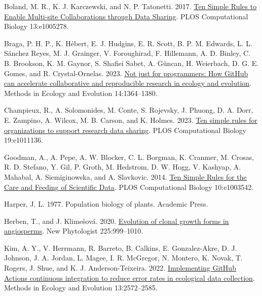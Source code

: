 \documentclass[
  letterpaper,
  oneside,
  open=any]{scrbook}
\newlength{\cslhangindent}
\newenvironment{CSLReferences}[2] %
 {\begin{list}{}{%
  \setlength{\itemindent}{0pt}
  \setlength{\leftmargin}{0pt}
  \setlength{\parsep}{0pt}
  \ifodd #1
   \setlength{\leftmargin}{\cslhangindent}
   \setlength{\itemindent}{-1\cslhangindent}
  \fi
  \setlength{\itemsep}{#2\baselineskip}}}
 {\end{list}}
\begin{document}
\label{refs}
\begin{CSLReferences}{1}{0}
Boland, M. R., K. J. Karczewski, and N. P. Tatonetti. 2017.
\href{https://doi.org/10.1371/journal.pcbi.1005278}{Ten {Simple Rules}
to {Enable Multi-site Collaborations} through {Data Sharing}}. PLOS
Computational Biology 13:e1005278.

Braga, P. H. P., K. Hébert, E. J. Hudgins, E. R. Scott, B. P. M.
Edwards, L. L. Sánchez Reyes, M. J. Grainger, V. Foroughirad, F.
Hillemann, A. D. Binley, C. B. Brookson, K. M. Gaynor, S. Shafiei Sabet,
A. Güncan, H. Weierbach, D. G. E. Gomes, and R. Crystal-Ornelas. 2023.
\href{https://doi.org/10.1111/2041-210X.14108}{Not just for programmers:
{How GitHub} can accelerate collaborative and reproducible research in
ecology and evolution}. Methods in Ecology and Evolution 14:1364--1380.

Champieux, R., A. Solomonides, M. Conte, S. Rojevsky, J. Phuong, D. A.
Dorr, E. Zampino, A. Wilcox, M. B. Carson, and K. Holmes. 2023.
\href{https://doi.org/10.1371/journal.pcbi.1011136}{Ten simple rules for
organizations to support research data sharing}. PLOS Computational
Biology 19:e1011136.

Goodman, A., A. Pepe, A. W. Blocker, C. L. Borgman, K. Cranmer, M.
Crosas, R. D. Stefano, Y. Gil, P. Groth, M. Hedstrom, D. W. Hogg, V.
Kashyap, A. Mahabal, A. Siemiginowska, and A. Slavkovic. 2014.
\href{https://doi.org/10.1371/journal.pcbi.1003542}{Ten {Simple Rules}
for the {Care} and {Feeding} of {Scientific Data}}. PLOS Computational
Biology 10:e1003542.

Harper, J. L. 1977. Population biology of plants. Academic Press.

Herben, T., and J. Klimešová. 2020.
\href{https://doi.org/10.1111/nph.16188}{Evolution of clonal growth
forms in angiosperms}. New Phytologist 225:999--1010.

Kim, A. Y., V. Herrmann, R. Barreto, B. Calkins, E. Gonzalez-Akre, D. J.
Johnson, J. A. Jordan, L. Magee, I. R. McGregor, N. Montero, K. Novak,
T. Rogers, J. Shue, and K. J. Anderson-Teixeira. 2022.
\href{https://doi.org/10.1111/2041-210X.13982}{Implementing {GitHub
Actions} continuous integration to reduce error rates in ecological data
collection}. Methods in Ecology and Evolution 13:2572--2585.


\end{CSLReferences}
\end{document}
